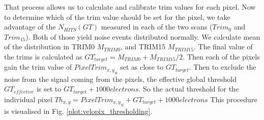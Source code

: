 That process allows us to calculate and calibrate trim values for each pixel.
Now to determine which of the trim value should be set for the pixel, we
take advantage of the $N_{HITS}(GT)$ measured in each of the two scans ($Trim_{0}$ and $Trim_{15}$). Both of those
yield noise events distributed normally.
We calculate mean of the distribution in TRIM0 $M_{TRIM0}$, and TRIM15
$M_{TRIM15}$. The final value of the trims is calculated as
$GT_{target} = M_{TRIM0}+M_{TRIM15}/2$.
Then each of the pixels gain the trim value of ${PixelTrim_{x,y}}_{a}$ set as close to
$GT_{target}$.
Then to exclude the noise from the signal coming from the pixels, the
effective global threshold $GT_{effective}$ is set to
$GT_{target} + 1000 electrons$.
So the actual threshold for the individual pixel
$Th_{x,y} = {PixelTrim_{x,y}}_{a} + GT_{target} + 1000 electrons$
This procedure is visualised in Fig. \ref{plot:velopix_thresholding}.
